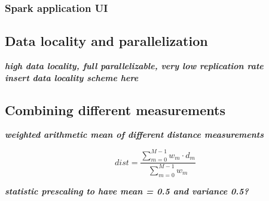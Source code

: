\subsubsection{Spark application UI}

\subsection{Data locality and parallelization}

\noindent\textit{\textbf{high data locality, full parallelizable, very low replication rate\\}}
\noindent\textit{\textbf{insert data locality scheme here\\}}

\subsection{Combining different measurements}

\noindent\textit{\textbf{weighted arithmetic mean of different distance measurements\\}}

\begin{equation} \label{eq:distance}
dist = \frac{\sum_{m = 0}^{M - 1}{w_m \cdot d_m}}{\sum_{m = 0}^{M - 1}{w_m}}
\end{equation}

\noindent\textit{\textbf{statistic prescaling to have mean = 0.5 and variance 0.5?\\}}


